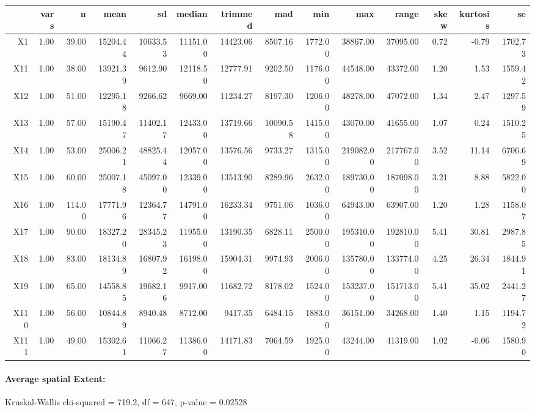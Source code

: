   \begin{tabular}{rrrrrrrrrrrrrr}
	\hline
   	& vars & n & mean & sd & median & trimmed & mad & min & max & range & skew & kurtosis & se \\ 
	\hline
  	X1 & 1.00 & 39.00 & 15204.44 & 10633.53 & 11151.00 & 14423.06 & 8507.16 & 1772.00 & 38867.00 & 37095.00 & 0.72 & -0.79 & 1702.73 \\ 
	X11 & 1.00 & 38.00 & 13921.39 & 9612.90 & 12118.50 & 12777.91 & 9202.50 & 1176.00 & 44548.00 & 43372.00 & 1.20 & 1.53 & 1559.42 \\ 
	X12 & 1.00 & 51.00 & 12295.18 & 9266.62 & 9669.00 & 11234.27 & 8197.30 & 1206.00 & 48278.00 & 47072.00 & 1.34 & 2.47 & 1297.59 \\ 
	X13 & 1.00 & 57.00 & 15190.47 & 11402.17 & 12433.00 & 13719.66 & 10090.58 & 1415.00 & 43070.00 & 41655.00 & 1.07 & 0.24 & 1510.25 \\ 
	X14 & 1.00 & 53.00 & 25006.21 & 48825.44 & 12057.00 & 13576.56 & 9733.27 & 1315.00 & 219082.00 & 217767.00 & 3.52 & 11.14 & 6706.69 \\ 
	X15 & 1.00 & 60.00 & 25007.18 & 45097.00 & 12339.00 & 13513.90 & 8289.96 & 2632.00 & 189730.00 & 187098.00 & 3.21 & 8.88 & 5822.00 \\ 
	X16 & 1.00 & 114.00 & 17771.96 & 12364.77 & 14791.00 & 16233.34 & 9751.06 & 1036.00 & 64943.00 & 63907.00 & 1.20 & 1.28 & 1158.07 \\ 
	X17 & 1.00 & 90.00 & 18327.20 & 28345.23 & 11955.00 & 13190.35 & 6828.11 & 2500.00 & 195310.00 & 192810.00 & 5.41 & 30.81 & 2987.85 \\ 
	X18 & 1.00 & 83.00 & 18134.89 & 16807.92 & 16198.00 & 15904.31 & 9974.93 & 2006.00 & 135780.00 & 133774.00 & 4.25 & 26.34 & 1844.91 \\ 
	X19 & 1.00 & 65.00 & 14558.85 & 19682.16 & 9917.00 & 11682.72 & 8178.02 & 1524.00 & 153237.00 & 151713.00 & 5.41 & 35.02 & 2441.27 \\ 
	X110 & 1.00 & 56.00 & 10844.89 & 8940.48 & 8712.00 & 9417.35 & 6484.15 & 1883.00 & 36151.00 & 34268.00 & 1.40 & 1.15 & 1194.72 \\ 
	X111 & 1.00 & 49.00 & 15302.61 & 11066.27 & 11386.00 & 14171.83 & 7064.59 & 1925.00 & 43244.00 & 41319.00 & 1.02 & -0.06 & 1580.90 \\ 
	 \hline
  \end{tabular}

\paragraph{Average spatial Extent:}
Kruskal-Wallis chi-squared = 719.2, df = 647, p-value = 0.02528

